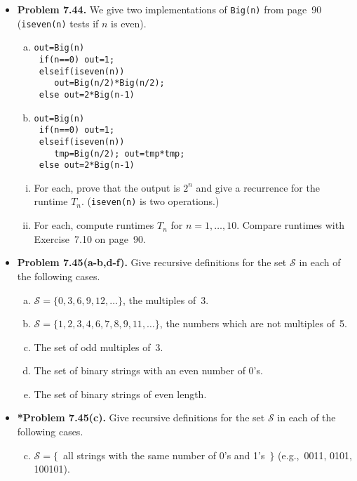 \documentclass[11pt]{article}
\begin{document}
\begin{itemize}
\item \textbf{Problem 7.44.}
We give two implementations of \verb+Big(n)+ from page~90
(\verb+iseven(n)+ tests if $n$ is even).
\begin{multicols}{2}
\begin{enumerate}[(a)]
\item
\begin{verbatim}
out=Big(n)
 if(n==0) out=1;
 elseif(iseven(n))
    out=Big(n/2)*Big(n/2);
 else out=2*Big(n-1)
\end{verbatim}
\item
\begin{verbatim}
out=Big(n)
 if(n==0) out=1;
 elseif(iseven(n))
    tmp=Big(n/2); out=tmp*tmp;
 else out=2*Big(n-1)
\end{verbatim}
\end{enumerate}
\end{multicols}

\begin{enumerate}[(i)]
\item For each, prove that the output is $2^n$ and give a recurrence for the runtime $T_n$.
  (\verb+iseven(n)+ is two operations.)
\item For each, compute runtimes $T_n$ for $n=1,\ldots,10$.
  Compare runtimes with Exercise~7.10 on page~90.
\end{enumerate}

\vspace{0.1in}

\item \textbf{Problem 7.45(a-b,d-f).}
Give recursive definitions for the set $\mathcal{S}$ in each of the following cases.
\begin{enumerate}[(a)]
\item $\mathcal{S}=\{0,3,6,9,12,\dots\}$, the multiples of~3.
\item $\mathcal{S}=\{1,2,3,4,6,7,8,9,11,\dots\}$, the numbers which are not multiples of~5.
\setcounter{enumi}{3}
\item The set of odd multiples of~3.
\item The set of binary strings with an even number of 0's.
\item The set of binary strings of even length.
\end{enumerate}

\vspace{0.1in}

\item \textbf{*Problem 7.45(c).}
Give recursive definitions for the set $\mathcal{S}$ in each of the following cases.
\begin{enumerate}[(a)]
\setcounter{enumi}{2}
\item $\mathcal{S}=\{$\ all strings with the same number of 0's and 1's\ $\}$
  (e.g.,~0011, 0101, 100101).
\end{enumerate}


\end{itemize}
\end{document}
